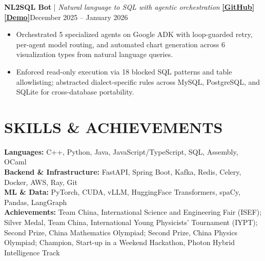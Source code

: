 \documentclass[10pt,letterpaper]{article}
\newcommand{\ressection}[1]{\section*{#1}}
\begin{document}
\vspace{1pt}
\textbf{NL2SQL Bot} \;|\; \textit{Natural language to SQL with agentic orchestration} \textbf{\href{https://github.com/ArtysicistZ/NL2SQL_Bot.git}{[GitHub]} \href{https://artysicistz.github.io/projects/nl2sql.html}{[Demo]}}\hfill December 2025 -- January 2026
\begin{itemize}
    \item Orchestrated 5 specialized agents on Google ADK with loop-guarded retry, per-agent model routing, and automated chart generation across 6 visualization types from natural language queries.
    \item Enforced read-only execution via 18 blocked SQL patterns and table allowlisting; abstracted dialect-specific rules across MySQL, PostgreSQL, and SQLite for cross-database portability.
\end{itemize}

\ressection{SKILLS \& ACHIEVEMENTS}

\textbf{Languages:} C++, Python, Java, JavaScript/TypeScript, SQL, Assembly, OCaml \\
\textbf{Backend \& Infrastructure:} FastAPI, Spring Boot, Kafka, Redis, Celery, Docker, AWS, Ray, Git \\
\textbf{ML \& Data:} PyTorch, CUDA, vLLM, HuggingFace Transformers, spaCy, Pandas, LangGraph \\
\textbf{Achievements:} Team China, International Science and Engineering Fair (ISEF); Silver Medal, Team China, International Young Physicists' Tournament (IYPT); Second Prize, China Mathematics Olympiad; Second Prize, China Physics Olympiad; Champion, Start-up in a Weekend Hackathon, Photon Hybrid Intelligence Track
\end{document}
